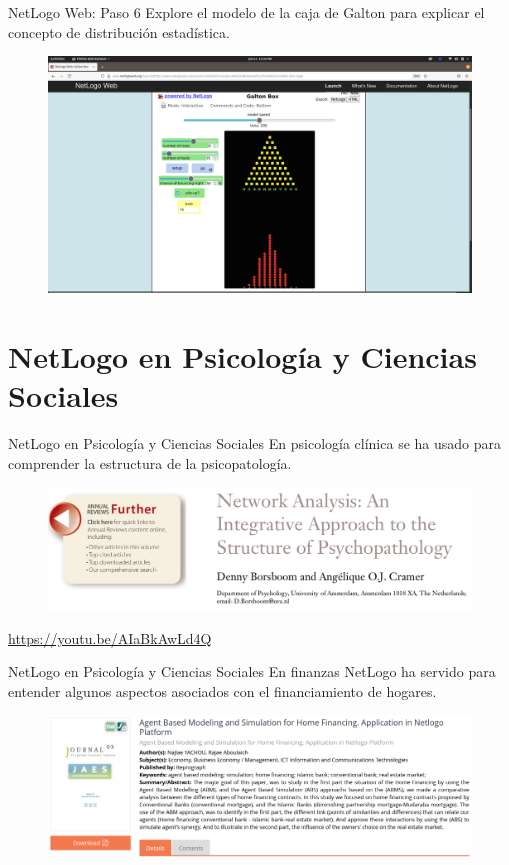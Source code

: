 \documentclass{beamer}
\begin{document}
\begin{frame}{NetLogo Web: Paso 6}
Explore el modelo de la caja de Galton para explicar el concepto de distribución estadística.
\begin{figure}
\centering
\includegraphics[width=.92\textwidth]{GaltonBox.png}
\end{figure}  
\end{frame}


\section{NetLogo en Psicología y Ciencias Sociales}
\begin{frame}{NetLogo en Psicología y Ciencias Sociales}
En psicología clínica se ha usado para comprender la estructura de la psicopatología.
\begin{figure}
\centering
\includegraphics[width=.85\textwidth]{Network.png}
\end{figure}
\cite{Borsboom2013} \textcolor{blue}{\url{https://youtu.be/AIaBkAwLd4Q}}
\end{frame}

\begin{frame}{NetLogo en Psicología y Ciencias Sociales}
En finanzas NetLogo ha servido para entender algunos aspectos asociados con el financiamiento de hogares.
\begin{figure}
\centering
\includegraphics[width=.85\textwidth]{jaes.png}
\end{figure}  
\cite{Yachou2018}
\end{frame}
\end{document}
